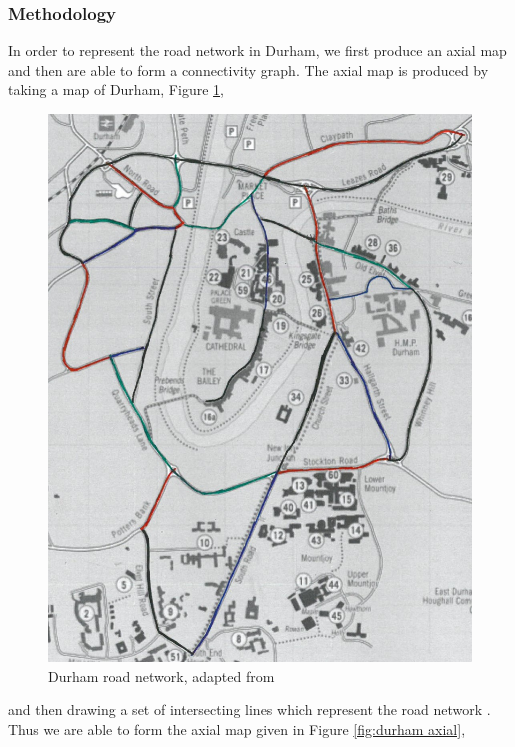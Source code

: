 \documentclass[11pt]{report}
\begin{document}
\subsubsection{Methodology}
In order to represent the road network in Durham, we first produce an axial map and then are able to form a connectivity graph. The axial map is produced by taking a map of Durham, Figure \ref{fig:durham map},\begin{figure}
\centering
\includegraphics[width=0.75\linewidth]{durham_with_colour.jpg}
\caption{Durham road network, adapted from \cite{undergraduate}}
\label{fig:durham map}
\end{figure} and then drawing a set of intersecting lines which represent the road network \cite{Axialmap40:online}. Thus we are able to form the axial map given in Figure \ref{fig:durham axial},
\end{document}
